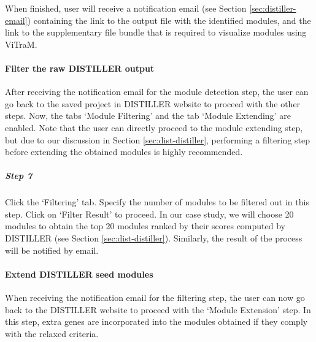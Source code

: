 When finished, user will receive a notification email (see Section 
\ref{sec:distiller-email}) containing the link to the output file with the
identified modules, and the link to the supplementary file bundle that is 
required to visualize modules using ViTraM.


\paragraph{Filter the raw DISTILLER output} After receiving the notification 
email for the module detection step, the user can go back to the saved project 
in DISTILLER website to proceed with the other steps. 
Now, the tabs `Module Filtering' and the tab `Module Extending' are enabled. 
Note that the user can directly proceed to the module extending step, but due 
to our discussion in Section \ref{sec:dist-distiller}, performing a filtering 
step before extending the obtained modules is highly recommended.

\vspace{-5mm}\begin{adjustwidth}{3mm}{0cm}
\nointerlineskip\leavevmode
\subparagraph{Step 7} Click the `Filtering' tab. Specify the number of 
modules to be filtered out in this step. Click on `Filter Result' to proceed.
In our case study, we will choose 20 modules to obtain the top 20 modules 
ranked by their scores computed by DISTILLER (see Section 
\ref{sec:dist-distiller}). Similarly, the result of the process will be 
notified by email.
\end{adjustwidth}


\paragraph{Extend DISTILLER seed modules} When receiving the notification email 
for the filtering step, the user can now go back to the DISTILLER 
website to proceed with the `Module Extension' step. 
In this step, extra genes are incorporated into the modules obtained if they 
comply with the relaxed criteria.

